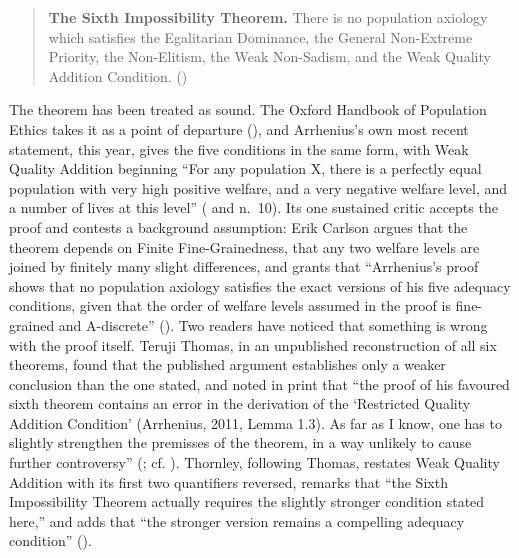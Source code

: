 \documentclass[
  11pt,
  letterpaper,
  DIV=11,
  numbers=noendperiod,
  twoside]{scrartcl}
\begin{document}
\begin{quote}
\textbf{The Sixth Impossibility Theorem.} There is no population
axiology which satisfies the Egalitarian Dominance, the General
Non-Extreme Priority, the Non-Elitism, the Weak Non-Sadism, and the Weak
Quality Addition Condition. ()
\end{quote}

The theorem has been treated as sound. The Oxford Handbook of Population
Ethics takes it as a point of departure
(), and
Arrhenius's own most recent statement, this year, gives the five
conditions in the same form, with Weak Quality Addition beginning ``For
any population X, there is a perfectly equal population with very high
positive welfare, and a very negative welfare level, and a number of
lives at this level'' ( and n.~10). Its one sustained critic accepts the proof and contests a
background assumption: Erik Carlson argues that the theorem depends on
Finite Fine-Grainedness, that any two welfare levels are joined by
finitely many slight differences, and grants that ``Arrhenius's proof
shows that no population axiology satisfies the exact versions of his
five adequacy conditions, given that the order of welfare levels assumed
in the proof is fine-grained and A-discrete''
(). Two readers have
noticed that something is wrong with the proof itself. Teruji Thomas, in
an unpublished reconstruction of all six theorems, found that the
published argument establishes only a weaker conclusion than the one
stated, and noted in print that ``the proof of his favoured sixth
theorem contains an error in the derivation of the `Restricted Quality
Addition Condition' (Arrhenius, 2011, Lemma 1.3). As far as I know, one
has to slightly strengthen the premisses of the theorem, in a way
unlikely to cause further controversy''
(; cf.
). Thornley, following Thomas,
restates Weak Quality Addition with its first two quantifiers reversed,
remarks that ``the Sixth Impossibility Theorem actually requires the
slightly stronger condition stated here,'' and adds that ``the stronger
version remains a compelling adequacy condition''
().
\end{document}

